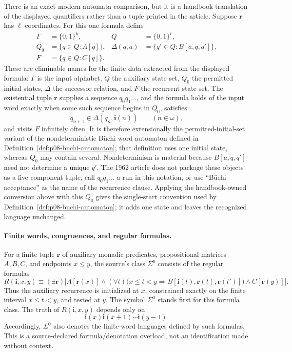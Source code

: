 There is an exact modern automata comparison, but it is a handbook translation
of the displayed quantifiers rather than a tuple printed in the article.
Suppose \(\mathbf r\) has \(\ell\) coordinates.  For this one formula define
\[
\begin{aligned}
 \Gamma&=\{0,1\}^k,
 &Q&=\{0,1\}^{\ell},\\
 Q_0&=\{q\in Q:A[q]\},
 &\Delta(q,a)&=\{q'\in Q:B[a,q,q']\},\\
 F&=\{q\in Q:C[q]\}.
\end{aligned}
\]
These are eliminable names for the finite data extracted from the displayed
formula: \(\Gamma\) is the input alphabet, \(Q\) the
auxiliary state set, \(Q_0\) the permitted initial states, \(\Delta\) the
successor relation, and \(F\) the recurrent state set.  The existential tuple
\(\mathbf r\) supplies a sequence \(q_0q_1\ldots\), and the formula holds of
the input word exactly when some such sequence begins in \(Q_0\), satisfies
\[
 q_{n+1}\in\Delta(q_n,\mathbf i(n))
 \qquad(n\in\omega),
\]
and visits \(F\) infinitely often.  It is therefore extensionally the
permitted-initial-set variant of the nondeterministic B\"uchi word automaton
defined in Definition~\ref{def:p08-buchi-automaton}; that definition uses one
initial state, whereas \(Q_0\) may contain several.  Nondeterminism is material
because \(B[a,q,q']\) need not determine a unique \(q'\).  The 1962 article
does not package these objects as a five-component tuple, call
\(q_0q_1\ldots\) a run in this notation, or use ``B\"uchi acceptance'' as the
name of the recurrence clause.  Applying the handbook-owned conversion above
with this \(Q_0\) gives the single-start convention used by
Definition~\ref{def:p08-buchi-automaton}; it adds one state and leaves the
recognized language unchanged.

\paragraph{Finite words, congruences, and regular formulas.}
For a finite tuple \(\mathbf r\) of auxiliary monadic predicates,
propositional matrices \(A,B,C\), and endpoints \(x\le y\), the source's class
\(\Sigma^0\) consists of the regular formulas
\[
 R(\mathbf i,x,y)\equiv
 (\exists\mathbf r)\bigl[
 A[\mathbf r(x)]
 \land
 (\forall t)\bigl(x\le t<y\Rightarrow
 B[\mathbf i(t),\mathbf r(t),\mathbf r(t')]\bigr)
 \land
 C[\mathbf r(y)]
 \bigr].
\]
Thus the auxiliary recurrence is initialized at \(x\), constrained exactly on
the finite interval \(x\le t<y\), and tested at \(y\).  The symbol
\(\Sigma^0\) stands first for this formula class.  The truth of
\(R(\mathbf i,x,y)\) depends only on
\[
 \mathbf i(x)\mathbf i(x+1)\cdots\mathbf i(y-1).
\]
Accordingly, \(\Sigma^0\) also denotes the finite-word languages defined by
such formulas.  This is a source-declared formula/denotation overload, not an
identification made without context.

